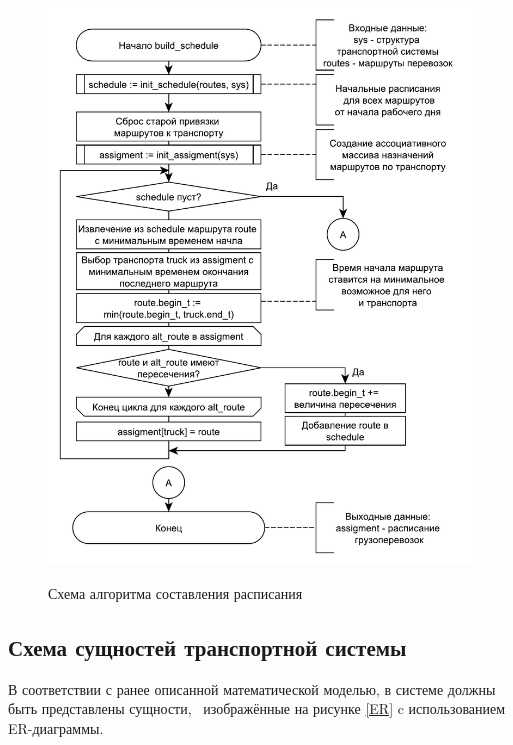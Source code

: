 \begin{figure}[hp]
	\begin{center}
		{\includegraphics[scale=0.8, angle=0, page=1]{img/schedule.pdf}}
		\caption{Схема алгоритма составления расписания}
		\label{alg:schedule}
	\end{center}
\end{figure}

\subsection{Схема сущностей транспортной системы}
В соответствии с ранее описанной математической моделью, в системе должны быть представлены сущности, \, изображённые на рисунке \ref{ER} c использованием ER-диаграммы.

